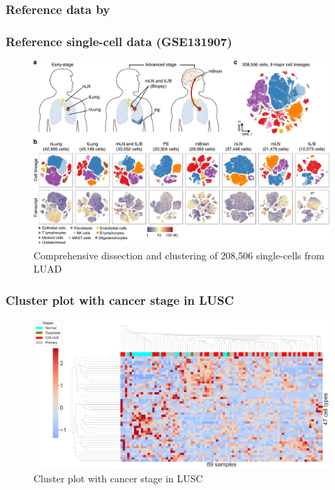 \documentclass{beamer}
\begin{document}
            \subsubsection{Reference data by \protect{}}
                \begin{frame}
                    \frametitle{Reference single-cell data (GSE131907)}

                    \begin{figure}
                        \includegraphics[width=0.8 \linewidth]{figures/LungCancer/reference_1.jpg}
                        \caption{Comprehensive dissection and clustering of 208,506 single-cells from LUAD \cite{singlecell-01}}
                    \end{figure}
                \end{frame}

                \begin{frame}
                    \frametitle{Cluster plot with cancer stage in LUSC}

                    \begin{figure}
                        \includegraphics[width=0.9 \linewidth]{figures/BisqueRNA/clustermap/STAR.TPM.GSE131907.SQC.pdf}
                        \caption{Cluster plot with cancer stage in LUSC}
                    \end{figure}
                \end{frame}
\end{document}
